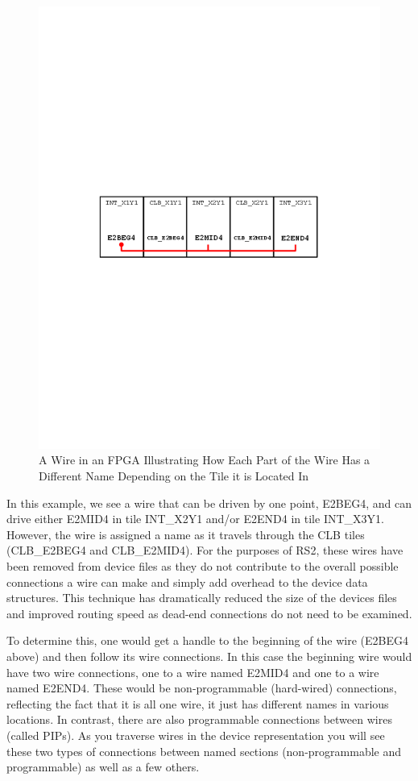 \documentclass[12pt]{article}
\begin{document}
\begin{figure}[H]
\centering
\includegraphics[width=0.8\columnwidth]{wireFigure}
\caption{A Wire in an FPGA Illustrating How Each Part of the Wire Has a
Different Name Depending on the Tile it is Located In}
\label{fig:wireFigure}
\end{figure}

In this example, we see a wire that can be driven by one point, E2BEG4, and can
drive either E2MID4 in tile INT\_X2Y1 and/or E2END4 in tile INT\_X3Y1.  However,
the wire is assigned a name as it travels through the CLB tiles (CLB\_E2BEG4 and
CLB\_E2MID4).  For the purposes of RS2, these wires have been removed from
device files as they do not contribute to the overall possible connections a wire can
make and simply add overhead to the device data structures.  This technique has
dramatically reduced the size of the devices files and improved routing speed as
dead-end connections do not need to be examined.

To determine this, one would get a handle to the beginning of the wire (E2BEG4
above) and then follow its wire connections.  In this case the beginning wire
would have two wire connections, one to a wire named E2MID4 and one to a wire
named E2END4.  These would be non-programmable (hard-wired) connections,
reflecting the fact that it is all one wire, it just has different names in
various locations.  In contrast, there are also programmable connections between
wires (called PIPs).  As you traverse wires in the device representation you
will see these two types of connections between named sections
(non-programmable and programmable) as well as a few others.
\end{document}
